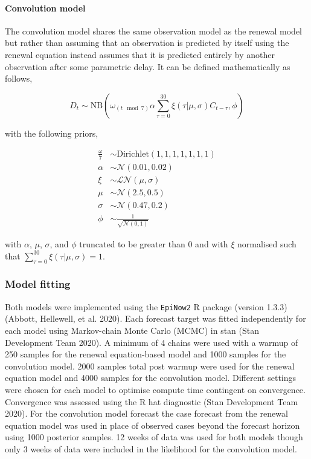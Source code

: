 \documentclass[
]{article}
\begin{document}
\hypertarget{convolution-model}{%
\paragraph{Convolution model}\label{convolution-model}}

The convolution model shares the same observation model as the renewal model but rather than assuming that an observation is predicted by itself using the renewal equation instead assumes that it is predicted entirely by another observation after some parametric delay. It can be defined mathematically as follows,

\begin{equation} 
    D_{t} \sim \mathrm{NB}\left(\omega_{(t \mod 7)} \alpha \sum_{\tau = 0}^{30} \xi(\tau | \mu, \sigma) C_{t-\tau},  \phi \right)
\end{equation}

with the following priors,

\begin{align*}
    \frac{\omega}{7} &\sim \mathrm{Dirichlet}(1, 1, 1, 1, 1, 1, 1) \\
    \alpha &\sim \mathcal{N}(0.01, 0.02) \\
    \xi &\sim \mathcal{LN}(\mu, \sigma) \\
    \mu &\sim \mathcal{N}(2.5, 0.5) \\
\sigma &\sim \mathcal{N}(0.47, 0.2) \\
\phi &\sim \frac{1}{\sqrt{\mathcal{N}(0, 1)}}
\end{align*}

with \(\alpha\), \(\mu\), \(\sigma\), and \(\phi\) truncated to be greater than 0 and with \(\xi\) normalised such that \(\sum_{\tau = 0}^{30} \xi(\tau | \mu, \sigma) = 1\).

\hypertarget{model-fitting}{%
\subsubsection{Model fitting}\label{model-fitting}}

Both models were implemented using the \texttt{EpiNow2} R package (version 1.3.3) (Abbott, Hellewell, et al. 2020). Each forecast target was fitted independently for each model using Markov-chain Monte Carlo (MCMC) in stan (Stan Development Team 2020). A minimum of 4 chains were used with a warmup of 250 samples for the renewal equation-based model and 1000 samples for the convolution model. 2000 samples total post warmup were used for the renewal equation model and 4000 samples for the convolution model. Different settings were chosen for each model to optimise compute time contingent on convergence. Convergence was assessed using the R hat diagnostic (Stan Development Team 2020). For the convolution model forecast the case forecast from the renewal equation model was used in place of observed cases beyond the forecast horizon using 1000 posterior samples. 12 weeks of data was used for both models though only 3 weeks of data were included in the likelihood for the convolution model.
\end{document}
